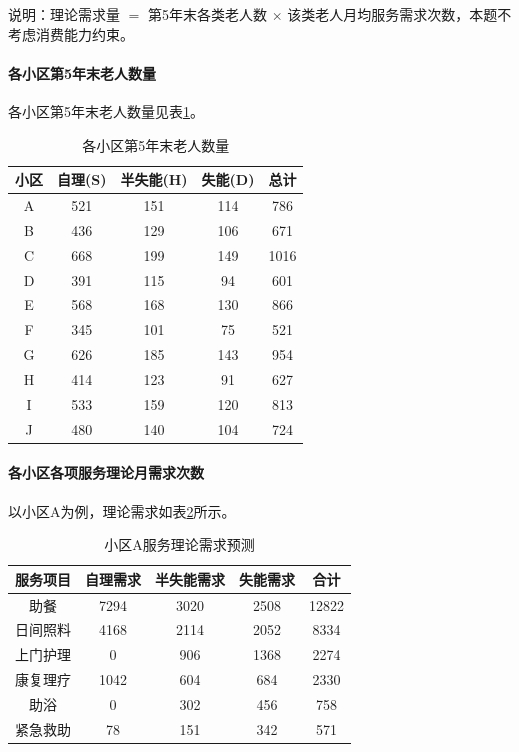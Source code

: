 \documentclass[UTF8]{ctexart}
\begin{document}
说明：理论需求量 $=$ 第5年末各类老人数 $\times$ 该类老人月均服务需求次数，本题不考虑消费能力约束。

\paragraph{各小区第5年末老人数量}
各小区第5年末老人数量见表\ref{tab:year5_pop}。

\begin{table}[H]
\centering
\caption{各小区第5年末老人数量}
\label{tab:year5_pop}
\renewcommand{\arraystretch}{1.3}
\begin{tabular}{|c|c|c|c|c|}
\hline
\textbf{小区} & \textbf{自理(S)} & \textbf{半失能(H)} & \textbf{失能(D)} & \textbf{总计} \\
\hline
A & 521 & 151 & 114 & 786 \\
\hline
B & 436 & 129 & 106 & 671 \\
\hline
C & 668 & 199 & 149 & 1016 \\
\hline
D & 391 & 115 & 94 & 601 \\
\hline
E & 568 & 168 & 130 & 866 \\
\hline
F & 345 & 101 & 75 & 521 \\
\hline
G & 626 & 185 & 143 & 954 \\
\hline
H & 414 & 123 & 91 & 627 \\
\hline
I & 533 & 159 & 120 & 813 \\
\hline
J & 480 & 140 & 104 & 724 \\
\hline
\end{tabular}
\end{table}

\paragraph{各小区各项服务理论月需求次数}
以小区A为例，理论需求如表\ref{tab:demand_A}所示。

\begin{table}[H]
\centering
\caption{小区A服务理论需求预测}
\label{tab:demand_A}
\renewcommand{\arraystretch}{1.3}
\begin{tabular}{|c|c|c|c|c|}
\hline
\textbf{服务项目} & \textbf{自理需求} & \textbf{半失能需求} & \textbf{失能需求} & \textbf{合计} \\
\hline
助餐 & 7294 & 3020 & 2508 & 12822 \\
\hline
日间照料 & 4168 & 2114 & 2052 & 8334 \\
\hline
上门护理 & 0 & 906 & 1368 & 2274 \\
\hline
康复理疗 & 1042 & 604 & 684 & 2330 \\
\hline
助浴 & 0 & 302 & 456 & 758 \\
\hline
紧急救助 & 78 & 151 & 342 & 571 \\
\hline
\end{tabular}
\end{table}
\end{document}
